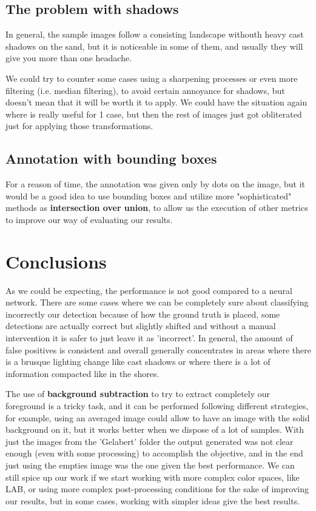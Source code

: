 \documentclass[11pt]{article}
\begin{document}
\subsection*{The problem with shadows}

In general, the sample images follow a consisting landscape withouth heavy cast shadows on the sand, but it is noticeable in some of them, and usually they will give you more than one headache.\newline

We could try to counter some cases using a sharpening processes or even more filtering (i.e. median filtering), to avoid certain annoyance for shadows, but doesn't mean that it will be worth it to apply. We could have the situation again where is really useful for 1 case, but then the rest of images just got obliterated just for applying those transformations.


\subsection*{Annotation with bounding boxes}
For a reason of time, the annotation was given only by dots on the image, but it would be a good idea to use bounding boxes and utilize more "sophisticated" methods as \textbf{intersection over union}, to allow us the execution of other metrics to improve our way of evaluating our results.

\section{Conclusions}


As we could be expecting, the performance is not good compared to a neural network. There are some cases where we can be completely sure about classifying incorrectly our detection because of how the ground truth is placed, some detections are actually correct but slightly shifted and without a manual intervention it is safer to just leave it as 'incorrect'. In general, the amount of false positives is consistent and overall  generally concentrates in areas where there is a brusque lighting change like cast shadows or where there is a lot of information compacted like in the shores.\newline

The use of \textbf{background subtraction} to try to extract completely our foreground is a tricky task, and it can be performed following different strategies, for example, using an averaged image could allow to have an image with the solid background on it, but it works better when we dispose of a lot of samples. With just the images from the 'Gelabert' folder the output generated was not clear enough (even with some processing) to accomplish the objective, and in the end just using the empties image was the one given the best performance. We can still spice up our work if we start working with more complex color spaces, like LAB, or using more complex post-processing conditions for the sake of improving our results, but in some cases, working with simpler ideas give the best results.\newline
\end{document}
